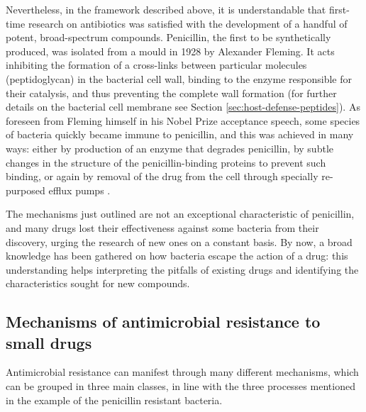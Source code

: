 Nevertheless, in the framework described above, it is understandable that first-time research on antibiotics was satisfied with the development of a handful of potent, broad-spectrum compounds.
%
Penicillin, the first to be synthetically produced, was isolated from a mould in 1928 by Alexander Fleming. It acts inhibiting the formation of a cross-links between particular molecules (peptidoglycan) in the bacterial cell wall, binding to the enzyme responsible for their catalysis, and thus preventing the complete wall formation \citep{Gordon2000} (for further details on the bacterial cell membrane see Section \ref{sec:host-defense-peptides}).
%
As foreseen from Fleming himself in his Nobel Prize acceptance speech, some species of bacteria quickly became immune to penicillin, and this was achieved in many ways: either by production of an enzyme that degrades penicillin, by subtle changes in the structure of the penicillin-binding proteins to prevent such binding, or again by removal of the drug from the cell through specially re-purposed efflux pumps \citep{Lobanovska2017}.

The mechanisms just outlined are not an exceptional characteristic of penicillin, and many drugs lost their effectiveness against some bacteria from their discovery, urging the research of new ones on a constant basis. By now, a broad knowledge has been gathered on how bacteria escape the action of a drug: this understanding helps interpreting the pitfalls of existing drugs and identifying the characteristics sought for new compounds.


\subsection{Mechanisms of antimicrobial resistance to small drugs} \label{sec:AMR_mechs}
Antimicrobial resistance can manifest through many different mechanisms, which can be grouped in three main classes, in line with the three processes mentioned in the example of the penicillin resistant bacteria.

